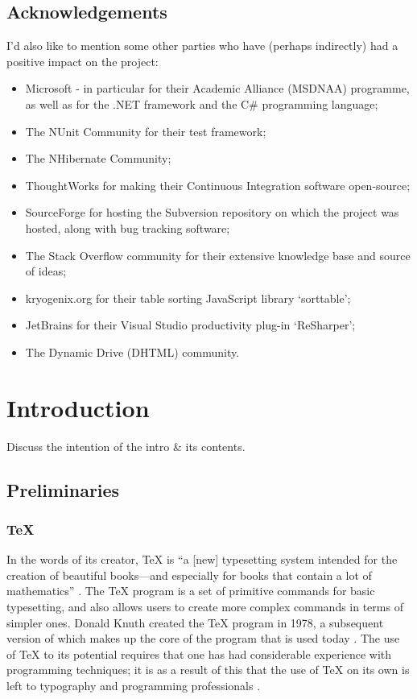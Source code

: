 \documentclass{l4proj}
\begin{document}
\section*{Acknowledgements}
I'd also like to mention some other parties who have (perhaps indirectly) had a positive impact on the project: \
\begin{itemize} 
\item Microsoft - in particular for their Academic Alliance (MSDNAA) programme, as well as for the .NET framework and the C\# programming language;
\item The NUnit Community for their test framework;
\item The NHibernate Community;
\item ThoughtWorks for making their Continuous Integration software open-source;
\item SourceForge for hosting the Subversion repository on which the project was hosted, along with bug tracking software;
\item The Stack Overflow community for their extensive knowledge base and source of ideas;
\item kryogenix.org for their table sorting JavaScript library `sorttable';
\item JetBrains for their Visual Studio productivity plug-in `ReSharper';
\item The Dynamic Drive (DHTML) community.
\end{itemize}

\educationalconsent
%
%
\tableofcontents
\chapter{Introduction}
\label{intro}
Discuss the intention of the intro \& its contents.

\section{Preliminaries}
\subsection{\TeX{}}
In the words of its creator, \TeX{} is ``a [new] typesetting system intended for the creation of beautiful books---and especially for books that contain a lot of mathematics'' \cite{DK84}.  The \TeX{} program is a set of primitive commands for basic typesetting, and also allows users to create more complex commands in terms of simpler ones.  Donald Knuth created the \TeX{} program in 1978, a subsequent version of which makes up the core of the program that is used today \cite{TeXOrigin}.  The use of \TeX{} to its potential requires that one has had considerable experience with programming techniques; it is as a result of this that the use of \TeX{} on its own is left to typography and programming professionals \cite{KD95}.
\end{document}

